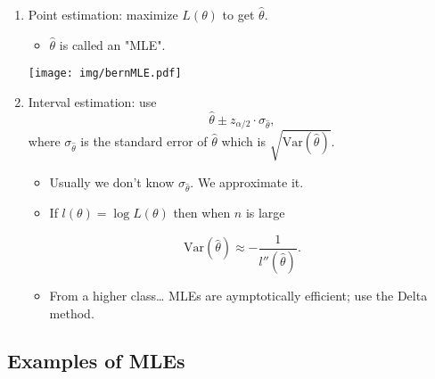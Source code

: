 \documentclass[11pt,english]{scrbook}
\begin{document}
\begin{enumerate}
\item Point estimation: maximize \(L(\theta)\) to get \(\hat{\theta}\).
\label{sec:org3bc33fc}
\begin{itemize}
\item \(\hat{\theta}\) is called an "MLE".
\end{itemize}

\begin{center}
\begin{center}
\texttt{[image: img/bernMLE.pdf]}
\end{center}

\end{center}

\item Interval estimation: use
\label{sec:orgdf53819}
\[
\hat{\theta} \pm z_{\alpha/2}\cdot \sigma_{\hat{\theta}},
\]
where \(\sigma_{\hat{\theta}}\) is the standard error of \(\hat{\theta}\) which is \(\sqrt{\mathrm{Var}(\hat{\theta})}\).  

\begin{itemize}
\item Usually we don't know \(\sigma_{\hat{\theta}}\).  We approximate it.
\item If \(l(\theta) = \log L(\theta)\) then when \(n\) is large
\end{itemize}
\[
\mathrm{Var}(\hat{\theta}) \approx -\frac{1}{l''(\hat{\theta})}.
\]

\begin{itemize}
\item From a higher class\ldots{} MLEs are aymptotically efficient; use the Delta method.
\end{itemize}
\end{enumerate}

\subsection{Examples of MLEs}
\label{sec:org665f53d}
\end{document}
